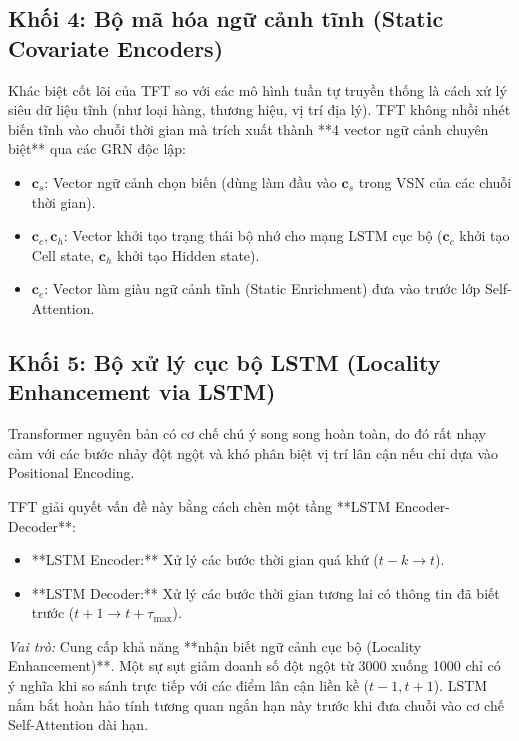 \documentclass[12pt,a4paper,oneside]{article}
\begin{document}
\subsection{Khối 4: Bộ mã hóa ngữ cảnh tĩnh (Static Covariate Encoders)}
\label{subsec:static_encoders}

Khác biệt cốt lõi của TFT so với các mô hình tuần tự truyền thống là cách xử lý siêu dữ liệu tĩnh (như loại hàng, thương hiệu, vị trí địa lý). TFT không nhồi nhét biến tĩnh vào chuỗi thời gian mà trích xuất thành **4 vector ngữ cảnh chuyên biệt** qua các GRN độc lập:

\begin{itemize}
    \item $\mathbf{c}_s$: Vector ngữ cảnh chọn biến (dùng làm đầu vào $\mathbf{c}_s$ trong VSN của các chuỗi thời gian).
    \item $\mathbf{c}_c, \mathbf{c}_h$: Vector khởi tạo trạng thái bộ nhớ cho mạng LSTM cục bộ ($\mathbf{c}_c$ khởi tạo Cell state, $\mathbf{c}_h$ khởi tạo Hidden state).
    \item $\mathbf{c}_e$: Vector làm giàu ngữ cảnh tĩnh (Static Enrichment) đưa vào trước lớp Self-Attention.
\end{itemize}

\subsection{Khối 5: Bộ xử lý cục bộ LSTM (Locality Enhancement via LSTM)}
\label{subsec:lstm_layer}

Transformer nguyên bản có cơ chế chú ý song song hoàn toàn, do đó rất nhạy cảm với các bước nhảy đột ngột và khó phân biệt vị trí lân cận nếu chỉ dựa vào Positional Encoding.

TFT giải quyết vấn đề này bằng cách chèn một tầng **LSTM Encoder-Decoder**:
\begin{itemize}
    \item **LSTM Encoder:** Xử lý các bước thời gian quá khứ ($t - k \rightarrow t$).
    \item **LSTM Decoder:** Xử lý các bước thời gian tương lai có thông tin đã biết trước ($t+1 \rightarrow t+\tau_{\max}$).
\end{itemize}
\textit{Vai trò:} Cung cấp khả năng **nhận biết ngữ cảnh cục bộ (Locality Enhancement)**. Một sự sụt giảm doanh số đột ngột từ 3000 xuống 1000 chỉ có ý nghĩa khi so sánh trực tiếp với các điểm lân cận liền kề ($t-1, t+1$). LSTM nắm bắt hoàn hảo tính tương quan ngắn hạn này trước khi đưa chuỗi vào cơ chế Self-Attention dài hạn.
\end{document}
